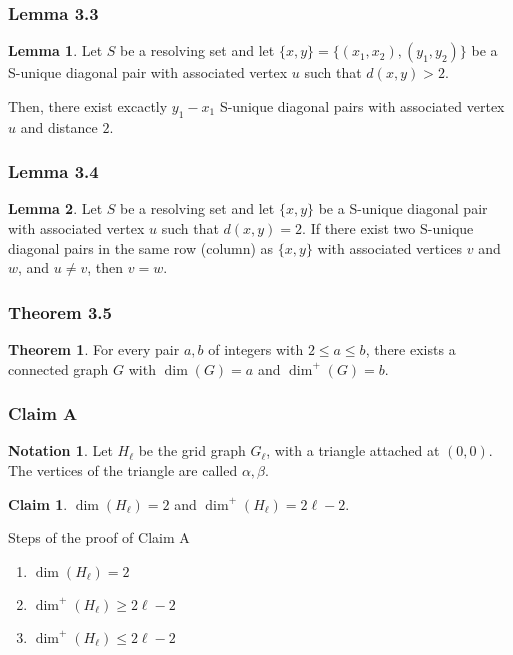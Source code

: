 \documentclass[hyperref={pdfpagelabels=false}]{beamer}
\theoremstyle{definition}
\newtheorem{ntn}{Notation}
\theoremstyle{theorem}
\newtheorem{lem}{Lemma}
\newtheorem{thm}{Theorem}
\newtheorem{clm}{Claim}
\begin{document}
\begin{frame}
	\frametitle{Lemma 3.3}
	\begin{lem}
		Let $S$ be a resolving set and let $\{x,y\} = \{(x_1,x_2),(y_1,y_2)\}$ be a S-unique diagonal pair with associated vertex $u$ such that $d(x,y)>2$.

		Then, there exist excactly $y_1 - x_1$ S-unique diagonal pairs with associated vertex $u$ and distance $2$.
	\end{lem}
\end{frame}
\begin{frame}
	\frametitle{Lemma 3.4}
	\begin{lem}
		Let $S$ be a resolving set and let $\{x,y\}$ be a S-unique diagonal pair with associated vertex $u$ such that $d(x,y)=2$. If there exist two S-unique diagonal pairs in the same row (column) as $\{x,y\}$ with associated vertices $v$ and $w$, and $u \neq v$, then $v = w$.
	\end{lem}
\end{frame}
\begin{frame}
	\frametitle{Theorem 3.5}
	\begin{thm}
		For every pair $a,b$ of integers with $2 \leq a \leq b$, there exists a connected graph $G$ with $\dim(G) = a$ and $\dim^+(G) = b$.
	\end{thm}
\end{frame}
\begin{frame}
	\frametitle{Claim A}
	\begin{ntn}
		Let $H_\ell$ be the grid graph $G_\ell$, with a triangle attached at $(0,0)$. The vertices of the triangle are called $\alpha, \beta$.
	\end{ntn}
	\begin{clm}
		$\dim(H_\ell) = 2$ and $\dim^+(H_\ell) = 2\ell - 2$.
	\end{clm}
	\begin{block}{Steps of the proof of Claim A}
		\begin{enumerate}
			\item $\dim(H_\ell) = 2$
			\item $\dim^+(H_\ell) \geq 2\ell - 2$
			\item $\dim^+(H_\ell) \leq 2\ell - 2$
		\end{enumerate}
	\end{block}
\end{frame}
\end{document}

